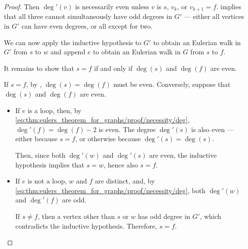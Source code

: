 \begin{proof}
  Then \( \deg'(v) \) is necessarily even unless \( v \) is \( s \), \( v_k \), or \( v_{k+1} = f \).  implies that all three cannot simultaneously have odd degrees in \( G' \) --- either all vertices in \( G' \) can have even degrees, or all except for two.

  We can now apply the inductive hypothesis to \( G' \) to obtain an Eulerian walk in \( G' \) from \( s \) to \( w \) and append \( e \) to obtain an Eulerian walk in \( G \) from \( s \) to \( f \).

  It remains to show that \( s = f \) if and only if \( \deg(s) \) and \( \deg(f) \) are even.

  If \( s = f \), by , \( \deg(s) = \deg(f) \) must be even. Conversely, suppose that \( \deg(s) \) and \( \deg(f) \) are even.
  \begin{itemize}
    \item If \( e \) is a loop, then, by \eqref{eq:thm:eulers_theorem_for_graphs/proof/necessity/deg}, \( \deg'(f) = \deg(f) - 2 \) is even. The degree \( \deg'(s) \) is also even --- either because \( s = f \), or otherwise because \( \deg'(s) = \deg(s) \).

    Then, since both \( \deg'(w) \) and \( \deg'(s) \) are even, the inductive hypothesis implies that \( s = w \), hence also \( s = f \).

    \item If \( e \) is not a loop, \( w \) and \( f \) are distinct, and, by \eqref{eq:thm:eulers_theorem_for_graphs/proof/necessity/deg}, both \( \deg'(w) \) and \( \deg'(f) \) are odd.

    If \( s \neq f \), then a vertex other than \( s \) or \( w \) has odd degree in \( G' \), which contradicts the inductive hypothesis. Therefore, \( s = f \).
  \end{itemize}
\end{proof}
